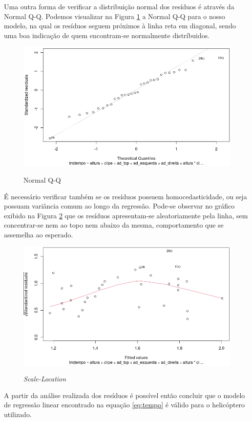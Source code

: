 Uma outra forma de verificar a distribuição normal dos resíduos é através da Normal Q-Q. Podemos visualizar na Figura \ref{fig:qq} a Normal Q-Q para o nosso modelo, na qual os resíduos seguem próximos à linha reta em diagonal, sendo uma boa indicação de quem encontram-se normalmente distríbuidos.

\begin{figure}[H]
  \caption{Normal Q-Q}
  \center
  \includegraphics[scale=0.42]{images/qq.png}
  \label{fig:qq}
\end{figure}

É necessário verificar também se os resíduos possuem homocedasticidade, ou seja possuam variância comum ao longo da regressão. Pode-se observar no gráfico exibido na Figura \ref{fig:scale} que os resíduos apresentam-se aleatoriamente pela linha, sem concentrar-se nem ao topo nem abaixo da mesma, comportamento que se assemelha ao esperado.

\begin{figure}[H]
  \caption{\textit{Scale-Location}}
  \center 
  \includegraphics[scale=0.42]{images/scale_location.png}
  \label{fig:scale}
\end{figure}

A partir da análise realizada dos resíduos é possível então concluir que o modelo de regressão linear encontrado na equação \ref{eq:tempo} é válido para o helicóptero utilizado.
